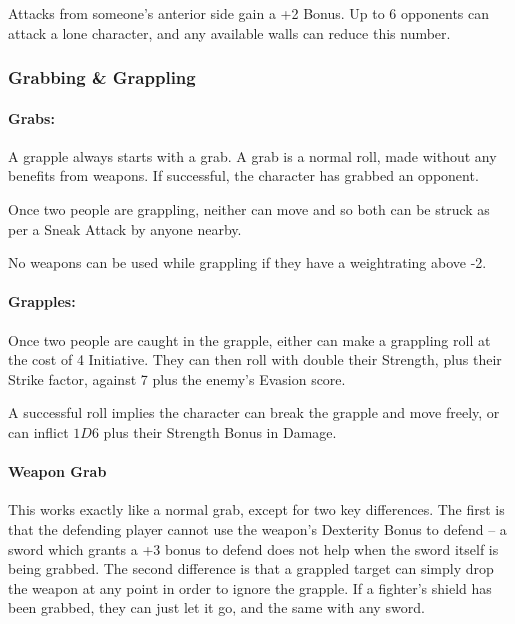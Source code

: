 \begin{multicols}{2}
Attacks from someone's anterior side gain a +2 Bonus.
Up to 6 opponents can attack a lone character, and any available walls can reduce this number.

\subsubsection{Grabbing \& Grappling}
\label{grappling}

\paragraph[Grabs: Make an attack without any weapon bonus. Both combatants are \textit{Entangled}. Cost: 4 Initiative]{Grabs:}

A grapple always starts with a grab.  A grab is a normal roll, made without any benefits from weapons.  If successful, the character has grabbed an opponent.

Once two people are grappling, neither can move and so both can be struck as per a Sneak Attack by anyone nearby.

No weapons can be used while grappling if they have a \gls{weightrating} above -2.

\paragraph[Grapple: Make an opposted roll of Strength x 2 + Combat.  Success means the combatant can either break free or inflict Damage.  Cost: 4 Initiative]{Grapples:}

Once two people are caught in the grapple, either can make a grappling roll at the cost of 4 Initiative.  They can then roll with double their Strength, plus their Strike factor, against 7 plus the enemy's Evasion score.

A successful roll implies the character can break the grapple and move freely, or can inflict $1D6$ plus their Strength Bonus in Damage.

\paragraph[Weapon Grab: Make a normal grab attack, ignoring the opponent's weapon bonus to Evasion.]{Weapon Grab}

This works exactly like a normal grab, except for two key differences.
The first is that the defending player cannot use the weapon's Dexterity Bonus to defend -- a sword which grants a +3 bonus to defend does not help when the sword itself is being grabbed.
The second difference is that a grappled target can simply drop the weapon at any point in order to ignore the grapple.
If a fighter's shield has been grabbed, they can just let it go, and the same with any sword.


\end{multicols}
